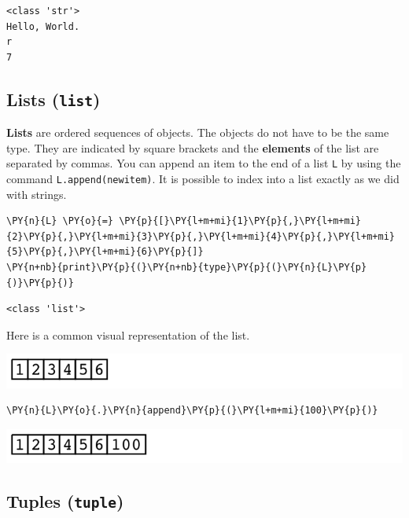 \begin{Verbatim}
<class 'str'>
Hello, World.
r
7
\end{Verbatim}

\subsection{Lists (\texttt{list})}


\textbf{Lists} are ordered sequences of objects.  The objects do not have to be the same type.  They are indicated by square brackets and the \textbf{elements} of the list are separated by commas.  You can append an item to the end of a list \texttt{L} by using the command \texttt{L.append(newitem)}.
It is possible to index into a list exactly as we did with strings.


\begin{Verbatim}[commandchars=\\\{\}]
\PY{n}{L} \PY{o}{=} \PY{p}{[}\PY{l+m+mi}{1}\PY{p}{,}\PY{l+m+mi}{2}\PY{p}{,}\PY{l+m+mi}{3}\PY{p}{,}\PY{l+m+mi}{4}\PY{p}{,}\PY{l+m+mi}{5}\PY{p}{,}\PY{l+m+mi}{6}\PY{p}{]}
\PY{n+nb}{print}\PY{p}{(}\PY{n+nb}{type}\PY{p}{(}\PY{n}{L}\PY{p}{)}\PY{p}{)}
\end{Verbatim}

\begin{Verbatim}
<class 'list'>
\end{Verbatim}


Here is a common visual representation of the list.


\includegraphics[width=\textwidth]{./figures/list_example01.png}

\begin{Verbatim}[commandchars=\\\{\}]
\PY{n}{L}\PY{o}{.}\PY{n}{append}\PY{p}{(}\PY{l+m+mi}{100}\PY{p}{)}
\end{Verbatim}



\includegraphics[width=\textwidth]{./figures/list_example02.png}

\subsection{Tuples (\texttt{tuple})}


